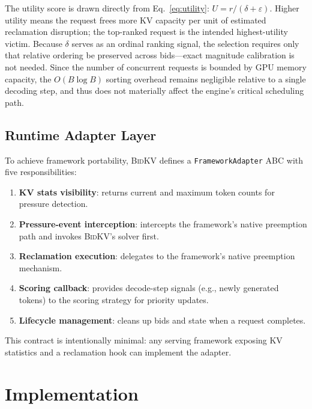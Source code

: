 \documentclass[conference]{IEEEtran}
\newcommand{\bidkv}{\textsc{BidKV}\xspace}
\newcommand{\utilfn}{\ensuremath{U}}
\newcommand{\tokfree}{\ensuremath{r}}
\newcommand{\qualdelta}{\ensuremath{\delta}}
\newcommand{\stabeps}{\ensuremath{\varepsilon}}
\newcommand{\eg}{e.g., }
\begin{document}


The utility score is drawn directly from Eq.~\ref{eq:utility}:
$\utilfn = \tokfree / (\qualdelta + \stabeps)$.  Higher utility means the
request frees more KV capacity per unit of estimated reclamation disruption;
the top-ranked request is the intended highest-utility victim.
Because $\qualdelta$ serves as an ordinal ranking signal, the selection
requires only that relative ordering be preserved across bids---exact
magnitude calibration is not needed. Since the number of concurrent requests
is bounded by GPU memory capacity, the $O(B \log B)$ sorting overhead
remains negligible relative to a single decoding step, and thus does not
materially affect the engine's critical scheduling path.

\subsection{Runtime Adapter Layer}\label{sec:design:adapter}

To achieve framework portability, \bidkv defines a
\texttt{Framework\-Adapter} ABC with five responsibilities:

\begin{enumerate}
\item \textbf{KV stats visibility}: returns current and maximum token counts
  for pressure detection.
\item \textbf{Pressure-event interception}: intercepts the framework's
  native preemption path and invokes \bidkv's solver first.
\item \textbf{Reclamation execution}: delegates to the framework's
  native preemption mechanism.
\item \textbf{Scoring callback}: provides decode-step signals (\eg newly
  generated tokens) to the scoring strategy for priority updates.
\item \textbf{Lifecycle management}: cleans up bids and state when a request
  completes.
\end{enumerate}

This contract is intentionally minimal: any serving framework exposing KV
statistics and a reclamation hook can implement the adapter.


\section{Implementation}\label{sec:impl}
\end{document}
